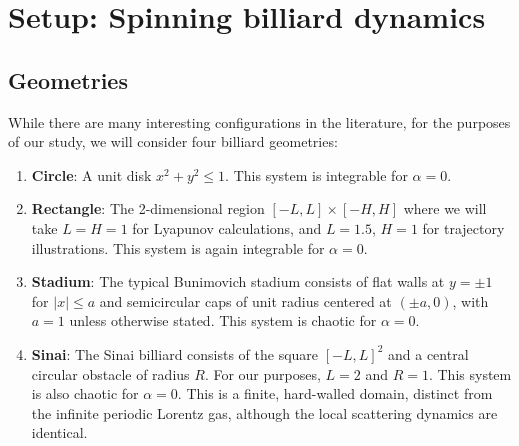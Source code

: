 \documentclass[aps,prd,twocolumn,superscriptaddress,nofootinbib,floatfix]{revtex4-2}
\begin{document}
\section{Setup: Spinning billiard dynamics}
\label{sec:setup}

\subsection{Geometries}
\noindent
While there are many interesting configurations in the literature, for the purposes of our study, we will consider four billiard geometries:
\begin{enumerate}
    \item \textbf{Circle}: A unit disk $x^2 + y^2 \le 1$. This system is integrable for $\alpha=0$.
    \item \textbf{Rectangle}: The 2-dimensional region $[-L,L]\times[-H,H]$ where we will take $L=H=1$ for Lyapunov calculations, and $L=1.5$, $H=1$ for trajectory illustrations. This system is again integrable for $\alpha=0$.
    \item \textbf{Stadium}: The typical Bunimovich stadium consists of flat walls at $y=\pm 1$ for $|x|\le a$ and semicircular caps of unit radius centered at $(\pm a, 0)$, with $a=1$ unless otherwise stated. This system is chaotic for $\alpha=0$.
    \item \textbf{Sinai}: The Sinai billiard consists of the square $[-L,L]^2$ and a central circular obstacle of radius $R$. For our purposes, $L=2$ and $R=1$. This system is also chaotic for $\alpha=0$. This is a finite, hard-walled domain, distinct from the infinite periodic Lorentz gas, although the local scattering dynamics are identical.
\end{enumerate}
\end{document}
